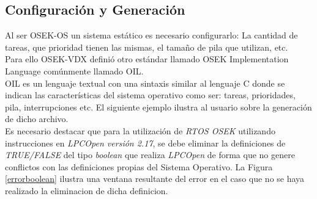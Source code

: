 \documentclass[12pt,letterpaper]{article}
\begin{document}
\subsection{Configuración y Generación}\label{sec:generacionoil}
Al ser OSEK-OS un sistema estático es necesario configurarlo: La cantidad de tareas, que prioridad tienen las mismas, el tamaño de pila que utilizan, etc.
  \\
  
Para ello OSEK-VDX definió otro estándar llamado OSEK Implementation Language comúnmente llamado OIL.
 \\
 
OIL es un lenguaje textual con una sintaxis similar al lenguaje C donde se indican las características del sistema operativo como ser: tareas, prioridades, pila, interrupciones etc. El siguiente ejemplo ilustra al usuario sobre la generación de dicho archivo.
 \\
 
Es necesario destacar que para la utilización de \textit{RTOS OSEK} utilizando instrucciones en \textit{LPCOpen versión 2.17}, se debe eliminar la definiciones de \textit{TRUE/FALSE} del tipo \textit{boolean} que realiza \textit{LPCOpen} de forma que no genere conflictos con las definiciones propias del Sistema Operativo. La Figura \ref{errorboolean} ilustra una ventana resultante del error en el caso que no se haya realizado la eliminacion de dicha definicion.
\end{document}
